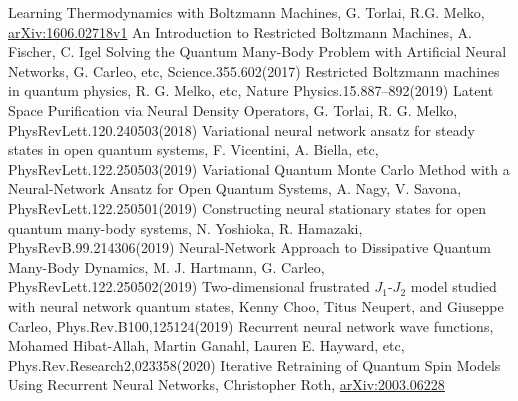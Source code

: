 \documentclass[letterpaper, 10pt]{article}
\begin{document}
\vskip 2cm
\centering
\begin{thebibliography}{99}
 Learning Thermodynamics with Boltzmann Machines, G. Torlai, R.G. Melko, \href{https://arxiv.org/abs/1606.02718}{arXiv:1606.02718v1}
 An Introduction to Restricted Boltzmann Machines, A. Fischer, C. Igel
 Solving the Quantum Many-Body Problem with Artificial Neural Networks, G. Carleo, etc, Science.355.602(2017)
 Restricted Boltzmann machines in quantum physics, R. G. Melko, etc, Nature Physics.15.887–892(2019)
 Latent Space Purification via Neural Density Operators, G. Torlai, R. G. Melko, PhysRevLett.120.240503(2018)
 Variational neural network ansatz for steady states in open quantum systems, F. Vicentini, A. Biella, etc, PhysRevLett.122.250503(2019)
 Variational Quantum Monte Carlo Method with a Neural-Network Ansatz for Open Quantum Systems, A. Nagy, V. Savona, PhysRevLett.122.250501(2019)
 Constructing neural stationary states for open quantum many-body systems, N. Yoshioka, R. Hamazaki, PhysRevB.99.214306(2019)
 Neural-Network Approach to Dissipative Quantum Many-Body Dynamics, M. J. Hartmann, G. Carleo, PhysRevLett.122.250502(2019)
 Two-dimensional frustrated $J_1$-$J_2$ model studied with neural network quantum states, Kenny Choo, Titus Neupert, and Giuseppe Carleo, Phys.Rev.B100,125124(2019)
 Recurrent neural network wave functions, Mohamed Hibat-Allah, Martin Ganahl, Lauren E. Hayward, etc, Phys.Rev.Research2,023358(2020)
 Iterative Retraining of Quantum Spin Models Using Recurrent Neural Networks, Christopher Roth, \href{https://arxiv.org/abs/2003.06228}{arXiv:2003.06228}
\end{thebibliography}
\end{document}
